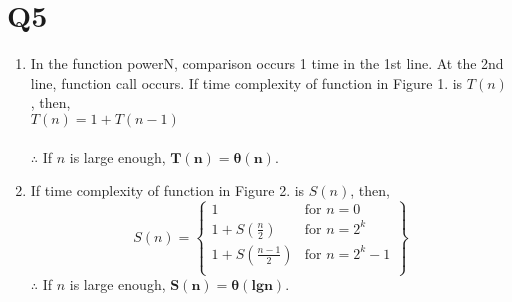 \documentclass[12pt,a4paper]{article}
\begin{document}
    \section{Q5}
    \begin{enumerate}[label=(\arabic*)]
        \item
            In the function powerN, comparison occurs 1 time in the 1st line.
            At the 2nd line, function call occurs.
            If time complexity of function in Figure 1. is $T(n)$, then, \\
            $T(n)=1+T(n-1)$\\
            \\
            $\therefore$ If $n$ is large enough, $\mathbf{T(n)=\theta(n)}$.

        \item
            If time complexity of function in Figure 2. is $S(n)$, then,\\
            \[
                S(n) = \left.
                    \begin{cases}
                        1 & \text{for } n=0\\
                        1+S(\frac{n}{2}) & \text{for } n=2^k\\
                        1+S(\frac{n-1}{2}) & \text{for } n=2^k-1\\
                    \end{cases}
                \right\}
            \]
            $\therefore$ If $n$ is large enough, $\mathbf{S(n)=\theta(lgn)}$.

    \end{enumerate}

    
\end{document}
